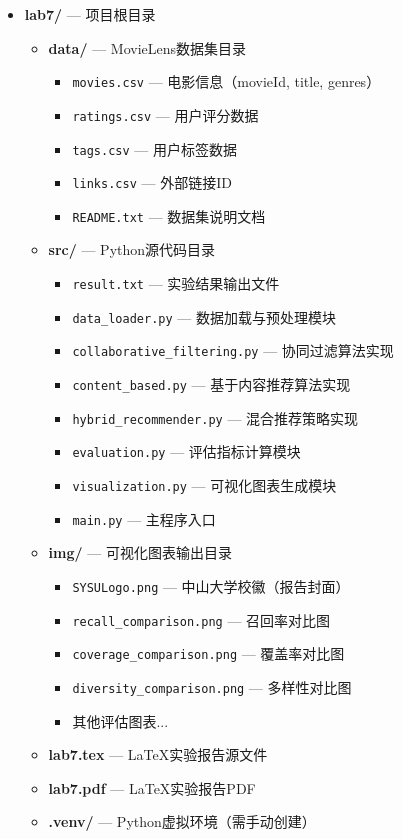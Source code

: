 \documentclass[a4paper]{article}
\begin{document}
\begin{itemize}
    \item \textbf{lab7/} --- 项目根目录
    \begin{itemize}
        \item \textbf{data/} --- MovieLens数据集目录
        \begin{itemize}
            \item \texttt{movies.csv} --- 电影信息（movieId, title, genres）
            \item \texttt{ratings.csv} --- 用户评分数据
            \item \texttt{tags.csv} --- 用户标签数据
            \item \texttt{links.csv} --- 外部链接ID
            \item \texttt{README.txt} --- 数据集说明文档
        \end{itemize}
        \item \textbf{src/} --- Python源代码目录
        \begin{itemize}
            \item \texttt{result.txt} --- 实验结果输出文件
            \item \texttt{data\_loader.py} --- 数据加载与预处理模块
            \item \texttt{collaborative\_filtering.py} --- 协同过滤算法实现
            \item \texttt{content\_based.py} --- 基于内容推荐算法实现
            \item \texttt{hybrid\_recommender.py} --- 混合推荐策略实现
            \item \texttt{evaluation.py} --- 评估指标计算模块
            \item \texttt{visualization.py} --- 可视化图表生成模块
            \item \texttt{main.py} --- 主程序入口
        \end{itemize}
        \item \textbf{img/} --- 可视化图表输出目录
        \begin{itemize}
            \item \texttt{SYSULogo.png} --- 中山大学校徽（报告封面）
            \item \texttt{recall\_comparison.png} --- 召回率对比图
            \item \texttt{coverage\_comparison.png} --- 覆盖率对比图
            \item \texttt{diversity\_comparison.png} --- 多样性对比图
            \item 其他评估图表...
        \end{itemize}
        \item \textbf{lab7.tex} --- LaTeX实验报告源文件
        \item \textbf{lab7.pdf} --- LaTeX实验报告PDF
        \item \textbf{.venv/} --- Python虚拟环境（需手动创建）
    \end{itemize}
\end{itemize}
\end{document}
